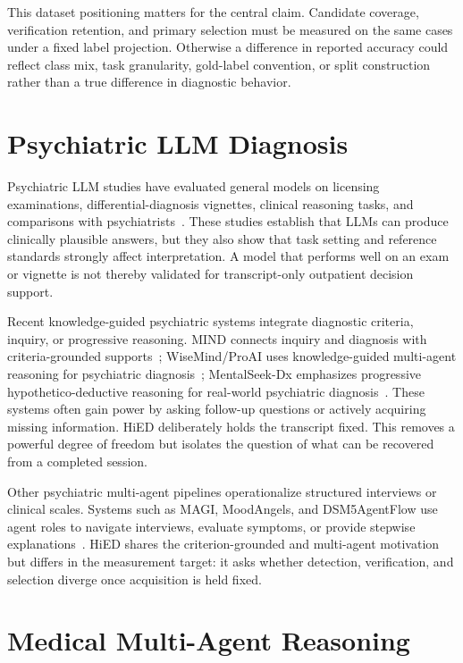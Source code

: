 This dataset positioning matters for the central claim. Candidate coverage, verification retention, and primary selection must be measured on the same cases under a fixed label projection. Otherwise a difference in reported accuracy could reflect class mix, task granularity, gold-label convention, or split construction rather than a true difference in diagnostic behavior.

\section{Psychiatric LLM Diagnosis}

Psychiatric LLM studies have evaluated general models on licensing examinations, differential-diagnosis vignettes, clinical reasoning tasks, and comparisons with psychiatrists~\citep{li2024taiwan,raballo2025,sarma2025}. These studies establish that LLMs can produce clinically plausible answers, but they also show that task setting and reference standards strongly affect interpretation. A model that performs well on an exam or vignette is not thereby validated for transcript-only outpatient decision support.

Recent knowledge-guided psychiatric systems integrate diagnostic criteria, inquiry, or progressive reasoning. MIND connects inquiry and diagnosis with criteria-grounded supports~\citep{li2026mind}; WiseMind/ProAI uses knowledge-guided multi-agent reasoning for psychiatric diagnosis~\citep{wu2026wisemind}; MentalSeek-Dx emphasizes progressive hypothetico-deductive reasoning for real-world psychiatric diagnosis~\citep{sun2026mentalseek}. These systems often gain power by asking follow-up questions or actively acquiring missing information. HiED deliberately holds the transcript fixed. This removes a powerful degree of freedom but isolates the question of what can be recovered from a completed session.

Other psychiatric multi-agent pipelines operationalize structured interviews or clinical scales. Systems such as MAGI, MoodAngels, and DSM5AgentFlow use agent roles to navigate interviews, evaluate symptoms, or provide stepwise explanations~\citep{bi2025magi,xiao2025moodangels,ozgun2025dsm5agentflow}. HiED shares the criterion-grounded and multi-agent motivation but differs in the measurement target: it asks whether detection, verification, and selection diverge once acquisition is held fixed.

\section{Medical Multi-Agent Reasoning}

